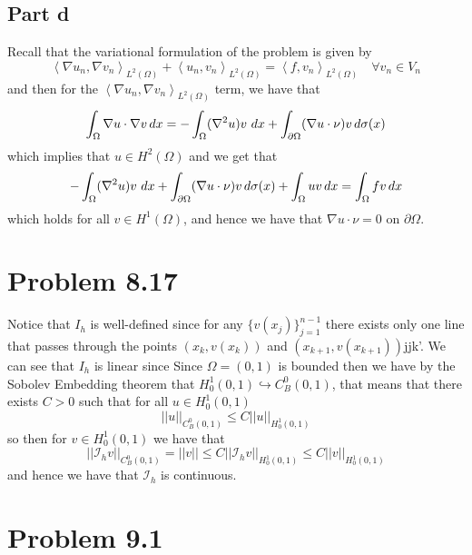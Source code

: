 \documentclass[12pt]{report}
\newcommand{\norm}[1]{\left|\left|#1\right|\right|}
\newcommand{\inner}[2]{\left\langle#1,#2\right\rangle}
\begin{document}
\subsection*{Part d}
Recall that the variational formulation of the problem is given by
\begin{equation*}
  \inner{\nabla u_n}{\nabla v_n}_{L^2(\Omega)} + \inner{u_n}{v_n}_{L^2(\Omega)} = \inner{f}{v_n}_{L^2(\Omega)} \quad \forall v_n \in V_n
\end{equation*}
and then for the $\inner{\nabla u_n}{\nabla v_n}_{L^2(\Omega)}$ term, we have that 
\begin{equation*}
  \int_{\Omega} \nabla u \cdot \nabla v \, dx = - \int_{\Omega} (\nabla^2 u)v \, \,dx + \int_{\partial \Omega}(\nabla u \cdot \nu)v \, d\sigma(x)
\end{equation*}
which implies that $u \in H^2(\Omega)$ and we get that
\begin{equation*}
  - \int_{\Omega} (\nabla^2 u)v \, \,dx + \int_{\partial \Omega}(\nabla u \cdot \nu)v \, d\sigma(x) + \int_{\Omega} uv \, dx = \int_{\Omega} fv \, dx 
\end{equation*}
which holds for all $v \in H^1(\Omega)$, and hence we have that $\nabla u \cdot \nu = 0$ on $\partial \Omega$.

\section*{Problem 8.17}
Notice that $I_h$ is well-defined since for any $\{v(x_j)\}_{j=1}^{n-1}$ there exists only one line that passes through the points $(x_k, v(x_k))$ and $(x_{k+1},v(x_{k+1}))$jjk'. We can see that $I_h$ is linear since
Since $\Omega = (0,1)$ is bounded then we have by the Sobolev Embedding theorem that $H_0^1(0,1) \hookrightarrow C_B^0(0,1)$, that means that there exists $C > 0$ such that for all $u \in H_0^1(0,1)$
\begin{equation*}
  \norm{u}_{C_B^0(0,1)} \leq C \norm{u}_{H_0^1(0,1)}
\end{equation*}
so then for $v \in H_0^1(0,1)$ we have that 
\begin{equation*}
  \norm{\mathcal{I}_h v}_{C_B^0(0,1)} = \norm{v}\leq C \norm{\mathcal{I}_h v}_{H_0^1(0,1)} \leq C \norm{v}_{H_0^1(0,1)}
\end{equation*}
and hence we have that $\mathcal{I}_h$ is continuous.

\section*{Problem 9.1}
\end{document}
